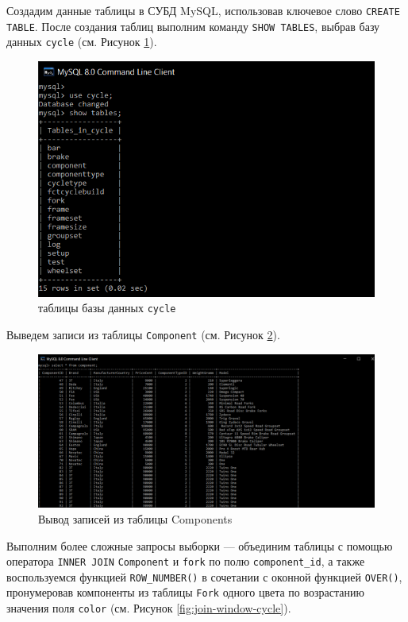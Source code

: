 \documentclass[a4paper,14pt]{extarticle}
\begin{document}
\newpage\hfill\newpage\hfill\newpage

Создадим данные таблицы в СУБД MySQL, использовав ключевое слово \texttt{CREATE TABLE}. После создания таблиц выполним команду \texttt{SHOW TABLES}, выбрав базу данных \texttt{cycle} (см. Рисунок \ref{fig:show-tables-cycle}).

\begin{figure}[h!]
	\centering
	\includegraphics[width=0.7\linewidth]{images/show-tables-cycle}
	\caption{таблицы базы данных \texttt{cycle}}
	\label{fig:show-tables-cycle}
\end{figure}


Выведем записи из таблицы \texttt{Component} (см. Рисунок \ref{fig:select-components}).

\begin{figure}[h!]
	\centering
	\includegraphics[width=0.7\linewidth]{images/select-components}
	\caption{Вывод записей из таблицы Components}
	\label{fig:select-components}
\end{figure}


Выполним более сложные запросы выборки --- объединим таблицы с помощью оператора \texttt{INNER JOIN} \texttt{Component} и \texttt{fork} по полю \linebreak \texttt{component\_id}, а также воспользуемся функцией \texttt{ROW\_NUMBER()} в сочетании с оконной функцией \texttt{OVER()}, пронумеровав компоненты из таблицы \texttt{Fork} одного цвета по возрастанию значения поля \texttt{color} (см. Рисунок \ref{fig:join-window-cycle}).
\end{document}
